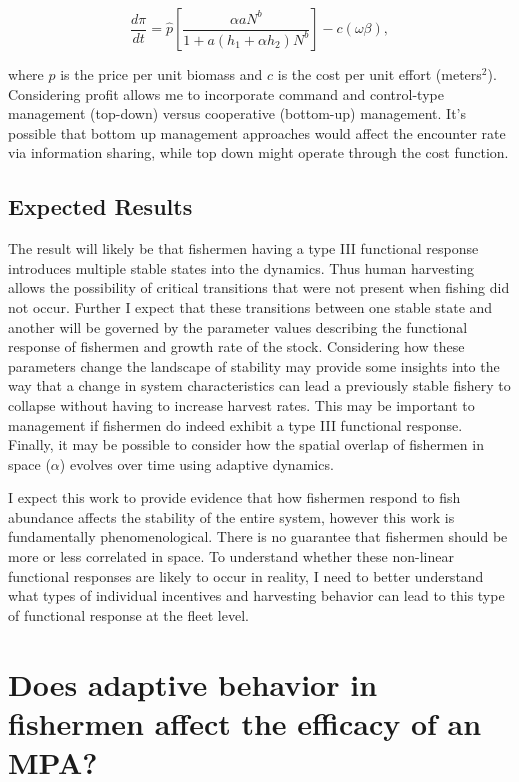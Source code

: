 \documentclass[12pt,a4paper]{report}
\begin{document}
\begin{equation}
\frac{d\pi}{dt} = \hat{p}\left[\frac{\alpha aN^b}{1+a(h_1+\alpha h_2)N^b}\right]-c(\omega\beta),
\end{equation}

\noindent where $\hat{p}$ is the price per unit biomass and $c$ is the cost per unit effort (meters$^2$). Considering profit allows me to incorporate command and control-type management (top-down) versus cooperative (bottom-up) management. It's possible that bottom up management approaches would affect the encounter rate via information sharing, while top down might operate through the cost function. 

\subsection{Expected Results}
The result will likely be that fishermen having a type III functional response introduces multiple stable states into the dynamics. Thus human harvesting allows the possibility of critical transitions that were not present when fishing did not occur. Further I expect that these transitions between one stable state and another will be governed by the parameter values describing the functional response of fishermen and growth rate of the stock. Considering how these parameters change the landscape of stability may provide some insights into the way that a change in system characteristics can lead a previously stable fishery to collapse without having to increase harvest rates.  This may be important to management if fishermen do indeed exhibit a type III functional response. Finally, it may be possible to consider how the spatial overlap of fishermen in space ($\alpha$) evolves over time using adaptive dynamics. 

I expect this work to provide evidence that how fishermen respond to fish abundance affects the stability of the entire system, however this work is fundamentally phenomenological. There is no guarantee that fishermen should be more or less correlated in space. To understand whether these non-linear functional responses are likely to occur in reality, I need to better understand what types of individual incentives and harvesting behavior can lead to this type of functional response at the fleet level. 
\section{Does adaptive behavior in fishermen affect the efficacy of an MPA?}
\end{document}
